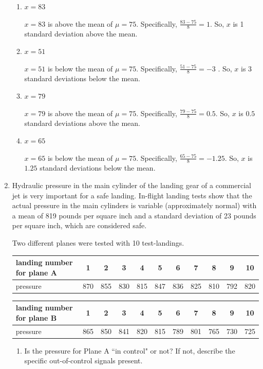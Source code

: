 \documentclass[11pt]{article}
\newcommand{\answer}[1]{\color{white}#1}
\begin{document}
\begin{enumerate}
	\begin{enumerate}
	\item $x=83$ 
	
	{\answer $x=83$ is above the mean of $\mu = 75$.  Specifically, $\frac{83-75}{8} = 1$.  So, $x$ is 1 standard deviation above the mean.}
	\item $x=51$ 
	
	{\answer $x=51$ is below the mean of $\mu = 75$.  Specifically, $\frac{51-75}{8} = -3$ .  So, $x$ is 3 standard deviations below the mean.}
	\item $x=79$ 
	
	{\answer $x=79$ is above the mean of $\mu = 75$.  Specifically, $\frac{79-75}{8} = 0.5$.  So, $x$ is $0.5$ standard deviations above the mean.}
	\item $x=65$ 
	
	{\answer $x=65$ is below the mean of $\mu = 75$.  Specifically, $\frac{65-75}{8} = -1.25$.  So, $x$ is $1.25$ standard deviations below the mean.}
	\end{enumerate}

\item Hydraulic pressure in the main cylinder of the landing gear of a commercial jet is very important for a safe landing.  In-flight landing tests show that the actual pressure in the main cylinders is variable (approximately normal) with a mean of 819 pounds per square inch and a standard deviation of 23 pounds per square inch, which are considered safe.

Two different planes were tested with 10 test-landings.  


\begin{tabular}{l|cccccccccc}
\hline 
landing number for plane A& 1& 2 & 3 & 4 & 5 & 6 & 7 & 8 & 9 & 10 \\
\hline
pressure & 870 & 855 & 830 & 815 & 847 & 836 & 825 & 810 & 792 & 820 \\
\hline
\end{tabular}

\begin{tabular}{l|cccccccccc}
\hline 
landing number for plane B& 1& 2 & 3 & 4 & 5 & 6 & 7 & 8 & 9 & 10 \\
\hline
pressure & 865 & 850 & 841 & 820 & 815 & 789 & 801 & 765 & 730 & 725 \\
\hline
\end{tabular}

	\begin{enumerate}
	\item  Is the pressure for Plane A ``in control" or not?  If not, describe the specific out-of-control signals present. 
	

\end{enumerate}
\end{enumerate}
\end{document}
